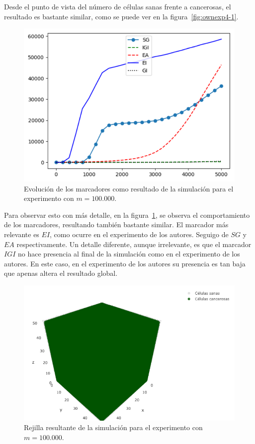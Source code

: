 Desde el punto de vista del número de células sanas frente a cancerosas, el resultado es
bastante similar, como se puede ver en la figura~\ref{fig:ownexp4-1}.

\begin{figure}[h]
\centering
\includegraphics[scale=0.8]{figures/experiments/exp4/mutations}
\caption{Evolución de los marcadores como resultado de la simulación para el experimento con $m = 100.000$.}
\label{fig:ownexp4-2}
\end{figure}

Para observar esto con más detalle, en la figura~\ref{fig:ownexp4-2}, se observa el comportamiento
de los marcadores, resultando también bastante similar. El marcador más relevante es $EI$,
como ocurre en el experimento de los autores. Seguigo de $SG$ y $EA$ respectivamente. Un detalle
diferente, aunque irrelevante, es que el marcador $IGI$ no hace presencia al final de la
simulación como en el experimento de los autores. En este caso, en el experimento de los autores
su presencia es tan baja que apenas altera el resultado global.

\begin{figure}[h]
\centering
\includegraphics[scale=0.6]{figures/experiments/exp4/grid}
\caption{Rejilla resultante de la simulación para el experimento con $m = 100.000$.}
\label{fig:ownexp4-3}
\end{figure}

